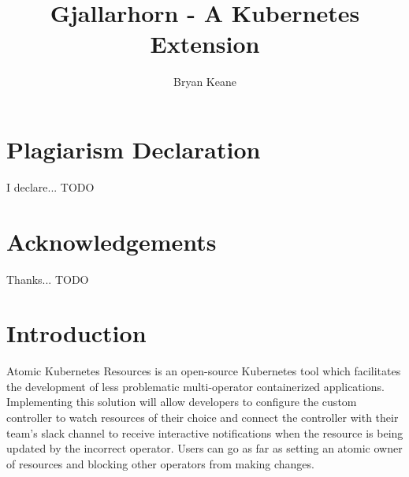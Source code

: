 \documentclass{article}
\title{Gjallarhorn - A Kubernetes Extension}
\author{Bryan Keane}
\begin{document}
\maketitle
\newpage

\tableofcontents
\newpage

\listoffigures
\newpage

\listoftables
\newpage


\section{Plagiarism Declaration}
I declare... TODO


\section{Acknowledgements}
Thanks... TODO


\section{Introduction}
Atomic Kubernetes Resources is an open-source Kubernetes tool which facilitates the development of less problematic multi-operator containerized applications. Implementing this solution will allow developers to configure the custom controller to watch resources of their choice and connect the controller with their team’s slack channel to receive interactive notifications when the resource is being updated by the incorrect operator. Users can go as far as setting an atomic owner of resources and blocking other operators from making changes.

\end{document}
